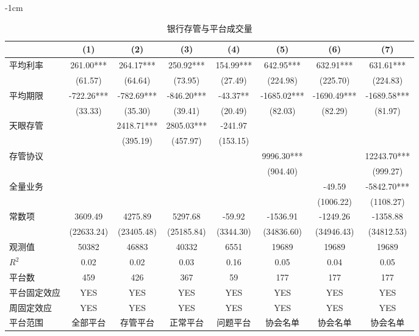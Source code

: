 \documentclass[lang=cn,11pt,authoryear]{elegantpaper}
\begin{document}
\begin{table}[htbp]
  \centering
    \addtolength{\leftskip} {-1cm}
    \addtolength{\rightskip}{-1cm}
  \caption{银行存管与平台成交量}
    \begin{tabular}{lccccccc}
    \toprule
          & (1)   & (2)   & (3)   & (4)   & (5)   & (6)   & (7) \\
    \midrule
    平均利率  & 261.00*** & 264.17*** & 250.92*** & 154.99*** & 642.95*** & 632.91*** & 631.61*** \\
          & (61.57) & (64.64) & (73.95) & (27.49) & (224.98) & (225.70) & (224.83) \\
    平均期限  & -722.26*** & -782.69*** & -846.20*** & -43.37** & -1685.02*** & -1690.49*** & -1689.58*** \\
          & (33.33) & (35.30) & (39.41) & (20.49) & (82.03) & (82.29) & (81.97) \\
    天眼存管  &       & 2418.71*** & 2805.03*** & -241.97 &       &       &  \\
          &       & (395.19) & (457.97) & (153.15) &       &       &  \\
    存管协议  &       &       &       &       & 9996.30*** &       & 12243.70*** \\
          &       &       &       &       & (904.40) &       & (999.27) \\
    全量业务  &       &       &       &       &       & -49.59 & -5842.70*** \\
          &       &       &       &       &       & (1006.22) & (1108.27) \\
    常数项   & 3609.49 & 4275.89 & 5297.68 & -59.92 & -1536.91 & -1249.26 & -1358.88 \\
          & (22633.24) & (23405.48) & (25185.84) & (3344.30) & (34836.60) & (34946.43) & (34812.53) \\
    观测值   & 50382 & 46883 & 40332 & 6551  & 19689 & 19689 & 19689 \\
    $R^{2}$    & 0.02  & 0.02  & 0.03  & 0.16  & 0.05  & 0.04  & 0.05 \\
    平台数   & 459   & 426   & 367   & 59    & 177   & 177   & 177 \\
    平台固定效应 & YES   & YES   & YES   & YES   & YES   & YES   & YES \\
    周固定效应 & YES   & YES   & YES   & YES   & YES   & YES   & YES \\
    平台范围  & 全部平台  & 存管平台  & 正常平台  & 问题平台  & 协会名单  & 协会名单  & 协会名单 \\
    \bottomrule
    \end{tabular}%
  \label{tab:volreg}%
\end{table}%
\end{document}
